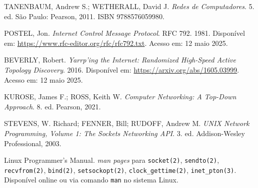 \documentclass[a4paper,10pt]{article}
\begin{document}
%
%

\newcommand{\department}{Departamento de Engenharia Eletrônica}

\newcommand{\code}{ELT087}

\newcommand{\subject}{Redes TCP/IP}

\newcommand{\reporttitle}{TRABALHO PRÁTICO II}

\newcommand{\reportsubtitle}{}

\newcommand{\studentname}{Aluno 1}

\newcommand{\registrationnumber}{Matricula 1}

\newcommand{\Astudentname}{Aluno 2}

\newcommand{\Aregistrationnumber}{Matricula}

\newcommand{\Bstudentname}{Aluno 3}

\newcommand{\Bregistrationnumber}{Matricula 3}



\tableofcontents

\pagebreak{}

 

\newpage

\begin{thebibliography}{9}

TANENBAUM, Andrew S.; WETHERALL, David J. \textit{Redes de Computadores}. 5. ed. São Paulo: Pearson, 2011. ISBN 9788576059980.

POSTEL, Jon. \textit{Internet Control Message Protocol}. RFC 792. 1981. Disponível em: \url{https://www.rfc-editor.org/rfc/rfc792.txt}. Acesso em: 12 maio 2025.

BEVERLY, Robert. \textit{Yarrp’ing the Internet: Randomized High-Speed Active Topology Discovery}. 2016. Disponível em: \url{https://arxiv.org/abs/1605.03999}. Acesso em: 12 maio 2025.

KUROSE, James F.; ROSS, Keith W. \textit{Computer Networking: A Top-Down Approach}. 8. ed. Pearson, 2021.

STEVENS, W. Richard; FENNER, Bill; RUDOFF, Andrew M. \textit{UNIX Network Programming, Volume 1: The Sockets Networking API}. 3. ed. Addison-Wesley Professional, 2003.

Linux Programmer's Manual. \textit{man pages} para \texttt{socket(2)}, \texttt{sendto(2)}, \texttt{recvfrom(2)}, \texttt{bind(2)}, \texttt{setsockopt(2)}, \texttt{clock\_gettime(2)}, \texttt{inet\_pton(3)}. Disponível online ou via comando \texttt{man} no sistema Linux.


\end{thebibliography}
\end{document}
